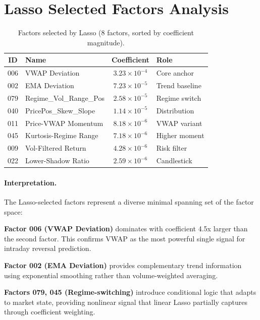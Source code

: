 \documentclass[sigconf]{acmart}
\begin{document}
\section{Lasso Selected Factors Analysis}
\label{app:lasso-factors}

\begin{table}[h]
  \caption{Factors selected by Lasso (8 factors, sorted by coefficient magnitude).}
  \centering
  \begin{small}
  \begin{tabular}{clcl}
    \toprule
    ID & Name & Coefficient & Role \\
    \midrule
    006 & VWAP Deviation & $3.23 \times 10^{-4}$ & Core anchor \\
    002 & EMA Deviation & $7.23 \times 10^{-5}$ & Trend baseline \\
    079 & Regime\_Vol\_Range\_Pos & $2.58 \times 10^{-5}$ & Regime switch \\
    040 & PricePos\_Skew\_Slope & $1.14 \times 10^{-5}$ & Distribution \\
    011 & Price-VWAP Momentum & $8.18 \times 10^{-6}$ & VWAP variant \\
    045 & Kurtosis-Regime Range & $7.18 \times 10^{-6}$ & Higher moment \\
    009 & Vol-Filtered Return & $4.28 \times 10^{-6}$ & Risk filter \\
    022 & Lower-Shadow Ratio & $2.59 \times 10^{-6}$ & Candlestick \\
    \bottomrule
  \end{tabular}
  \end{small}
\end{table}

\paragraph{Interpretation.}
The Lasso-selected factors represent a diverse minimal spanning set of the factor space:

\textbf{Factor 006 (VWAP Deviation)} dominates with coefficient 4.5x larger than the second factor.
This confirms VWAP as the most powerful single signal for intraday reversal prediction.

\textbf{Factor 002 (EMA Deviation)} provides complementary trend information using exponential smoothing rather than volume-weighted averaging.

\textbf{Factors 079, 045 (Regime-switching)} introduce conditional logic that adapts to market state, providing nonlinear signal that linear Lasso partially captures through coefficient weighting.
\end{document}

